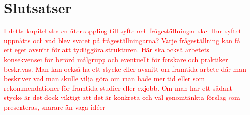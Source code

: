 \documentclass[a4paper,12pt,oneside,final]{extbook}
\begin{document}
\chapter{Slutsatser}

\textcolor{red}{I detta kapitel ska en återkoppling till syfte och frågeställningar ske. Har syftet uppnåtts och vad blev
svaret på frågeställningarna? Varje frågeställning kan få ett eget avsnitt för att tydliggöra strukturen.
Här ska också arbetets konsekvenser för berörd målgrupp och eventuellt för forskare och praktiker
beskrivas. Man kan också ha ett stycke eller avsnitt om framtida arbete där man beskriver vad man
skulle vilja göra om man hade mer tid eller som rekommendationer för framtida studier eller exjobb.
Om man har ett sådant stycke är det dock viktigt att det är konkreta och väl genomtänkta förslag som
presenteras, snarare än vaga idéer}






\pagestyle{empty}

\appendix
\end{document}
